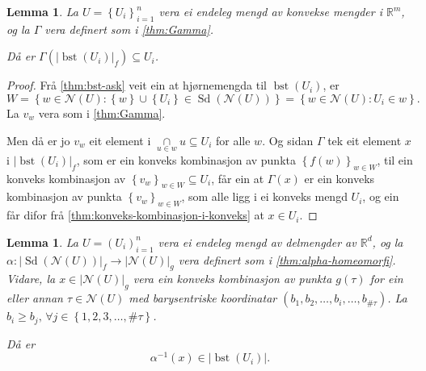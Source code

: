 \documentclass[a4paper, 12pt, norsk]{article}
\theoremstyle{plain}
\newtheorem{lemma}[theorem]{Lemma}
\theoremstyle{definition}
\newcommand{\Rb}{\mathbb{R}}
\newcommand{\Nc}{\mathcal{N}}
\newcommand{\intersect}{ \mathop{\cap}\limits }
\newcommand{\union}{ \mathop{\cup}\limits }
\newcommand{\gr}[1]{ \lvert #1 \rvert } %
\newcommand{\set}[1]{ \left\{ #1 \right\} } %
\newcommand{\tuple}[1]{ \left( #1 \right) } %
\DeclareMathOperator{\Sd}{Sd} %
\DeclareMathOperator{\bst}{bst} %
\begin{document}
\begin{lemma} \label{thm:Gamma-inni-ui}
	La \( U = \set{U_i}_{i=1}^n \) vera ei endeleg mengd av konvekse mengder i \( \Rb^m \), og la \( \Gamma \) vera definert som i \autoref{thm:Gamma}.

	Då er \( \Gamma(\gr{\bst(U_i)}_f) \subseteq U_i \).
\end{lemma}

\begin{proof}
	Frå \autoref{thm:bst-ask} veit ein at hjørnemengda til \( \bst(U_i) \), er
	\[
		W = \set{w \in \Nc(U) : \set{w} \union \set{U_i} \in \Sd(\Nc(U))}=\set{w \in \Nc(U) : U_i \in w}.
	\] 
	La \( v_w \) vera som i \autoref{thm:Gamma}.
	
	Men då er jo \( v_w \) eit element i \( \intersect_{u \in w} u \subseteq U_i \) for alle \( w \). Og sidan \( \Gamma \) tek eit element \( x \) i \( \gr{\bst(U_i)}_f \), som er ein konveks kombinasjon av punkta \( \set{f(w)}_{w \in W} \), til ein konveks kombinasjon av \( \set{v_w}_{w \in W} \subseteq U_i \), får ein at \( \Gamma(x) \) er ein konveks kombinasjon av punkta \( \set{v_w}_{w \in W} \), som alle ligg i ei konveks mengd \( U_i \), og ein får difor frå \autoref{thm:konveks-kombinasjon-i-konveks} at \( x \in U_i \).
\end{proof}

\begin{lemma} \label{thm:bst-betingingar}
	La \( U = \tuple{U_i}_{i=1}^n \) vera ei endeleg mengd av delmengder av \( \Rb^d \), og la \( \alpha: \gr{\Sd(\Nc(U))}_f \to \gr{\Nc(U)}_g \) vera definert som i \autoref{thm:alpha-homeomorfi}. Vidare, la \( x \in \gr{\Nc(U)}_g \) vera ein konveks kombinasjon av punkta \( g(\tau) \) for ein eller annan \( \tau \in \Nc(U) \) med barysentriske koordinatar \( \tuple{b_1, b_2,\dots, b_i, \dots, b_{\#\tau}} \). La \( b_i \geq b_j, \, \forall j \in \set{1, 2, 3, \dots, \#\tau} \). 
	
	Då er
	\[ 
		\alpha^{-1}(x) \in \gr{\bst(U_i)}.
	\]
\end{lemma}
\end{document}
